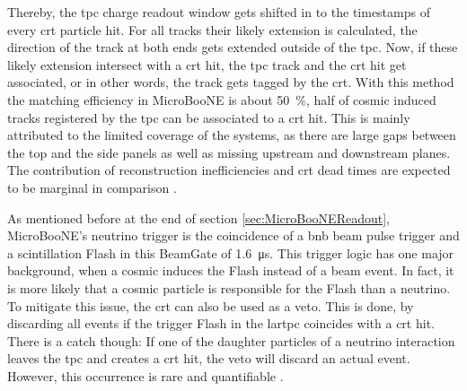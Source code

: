 Thereby, the \gls{tpc} charge readout window gets shifted in to the timestamps of every \gls{crt} particle hit. For all tracks their likely extension is calculated, \ie the direction of the track at both ends gets extended outside of the \gls{tpc}. Now, if these likely extension intersect with a \gls{crt} hit, the \gls{tpc} track and the \gls{crt} hit get associated, or in other words, the track gets tagged by the \gls{crt}. With this method the matching efficiency in MicroBooNE is about \SI{50}{\percent}, \ie half of cosmic induced tracks registered by the \gls{tpc} can be associated to a \gls{crt} hit. This is mainly attributed to the limited coverage of the systems, as there are large gaps between the top and the side panels as well as missing upstream and downstream planes. The contribution of reconstruction inefficiencies and \gls{crt} dead times are expected to be marginal in comparison \cite{CRTThomasPhD}.

As mentioned before at the end of section \ref{sec:MicroBooNEReadout}, MicroBooNE's neutrino trigger is the coincidence of a \gls{bnb} beam pulse trigger and a scintillation \gls{Flash} in this \gls{BeamGate} of \SI{1.6}{\micro\second}. This trigger logic has one major background, when a cosmic induces the \gls{Flash} instead of a beam event. In fact, it is more likely that a cosmic particle is responsible for the \gls{Flash} than a neutrino. To mitigate this issue, the \gls{crt} can also be used as a veto. This is done, by discarding all events if the trigger \gls{Flash} in the \gls{lartpc} coincides with a \gls{crt} hit. There is a catch though: If one of the daughter particles of a neutrino interaction leaves the \gls{tpc} and creates a \gls{crt} hit, the veto will discard an actual event. However, this occurrence is rare and quantifiable \cite{CRTThomasPhD}.

